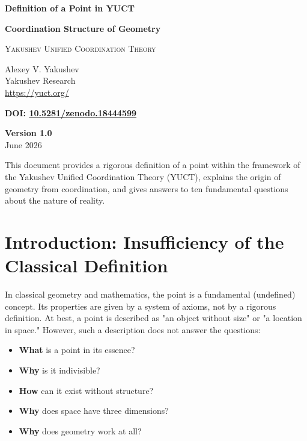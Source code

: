 \documentclass[12pt,a4paper]{article}
\begin{document}
	
	\begin{titlepage}
		\begin{center}
			\vspace*{1.5cm}
			\Huge\textbf{Definition of a Point in YUCT}
			
			\vspace{0.3cm}
			\Large\textbf{Coordination Structure of Geometry}
			
			\vspace{0.5cm}
			\large
			\textsc{Yakushev Unified Coordination Theory}
			
			\vspace{0.8cm}
			\large
			Alexey V. Yakushev \\
			Yakushev Research \\
			\url{https://yuct.org/}
			
			\vspace{0.5cm}
			\large
			\textbf{DOI: \href{https://doi.org/10.5281/zenodo.18444599}{10.5281/zenodo.18444599}}
			
			\vspace{1.5cm}
			\large
			\textbf{Version 1.0} \\
			June 2026
			
			\vfill
			\normalsize
			This document provides a rigorous definition of a point within the framework of the Yakushev Unified Coordination Theory (YUCT),
			explains the origin of geometry from coordination, and gives answers to ten fundamental questions about the nature of reality.
		\end{center}
	\end{titlepage}
	
	\tableofcontents
	\newpage
	
	\section{Introduction: Insufficiency of the Classical Definition}
	
	In classical geometry and mathematics, the point is a fundamental (undefined) concept. Its properties are given by a system of axioms, not by a rigorous definition. At best, a point is described as "an object without size" or "a location in space." However, such a description does not answer the questions:
	
	\begin{itemize}
		\item \textbf{What} is a point in its essence?
		\item \textbf{Why} is it indivisible?
		\item \textbf{How} can it exist without structure?
		\item \textbf{Why} does space have three dimensions?
		\item \textbf{Why} does geometry work at all?
	\end{itemize}
	
\end{document}
